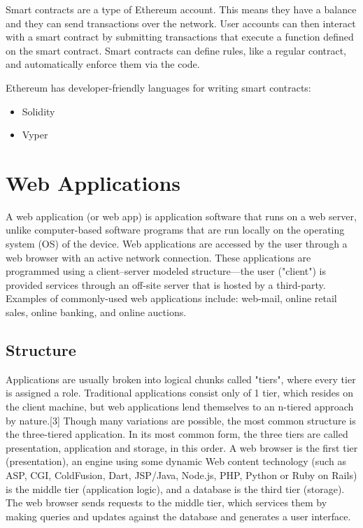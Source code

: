 Smart contracts are a type of Ethereum account. This means they have a balance and they can send transactions over the network. User accounts can then interact with a smart contract by submitting transactions that execute a function defined on the smart contract. Smart contracts can define rules, like a regular contract, and automatically enforce them via the code.\medskip

Ethereum has developer-friendly languages for writing smart contracts:

\begin{itemize}
\item Solidity
\item Vyper 
\end{itemize}

\section{Web Applications}

A web application (or web app) is application software that runs on a web server, unlike computer-based software programs that are run locally on the operating system (OS) of the device. Web applications are accessed by the user through a web browser with an active network connection. These applications are programmed using a client–server modeled structure—the user ("client") is provided services through an off-site server that is hosted by a third-party. Examples of commonly-used web applications include: web-mail, online retail sales, online banking, and online auctions.

\subsection{Structure}

Applications are usually broken into logical chunks called "tiers", where every tier is assigned a role. Traditional applications consist only of 1 tier, which resides on the client machine, but web applications lend themselves to an n-tiered approach by nature.[3] Though many variations are possible, the most common structure is the three-tiered application.\cite{MakeNtierArchitecture} In its most common form, the three tiers are called presentation, application and storage, in this order. A web browser is the first tier (presentation), an engine using some dynamic Web content technology (such as ASP, CGI, ColdFusion, Dart, JSP/Java, Node.js, PHP, Python or Ruby on Rails) is the middle tier (application logic), and a database is the third tier (storage). The web browser sends requests to the middle tier, which services them by making queries and updates against the database and generates a user interface.

